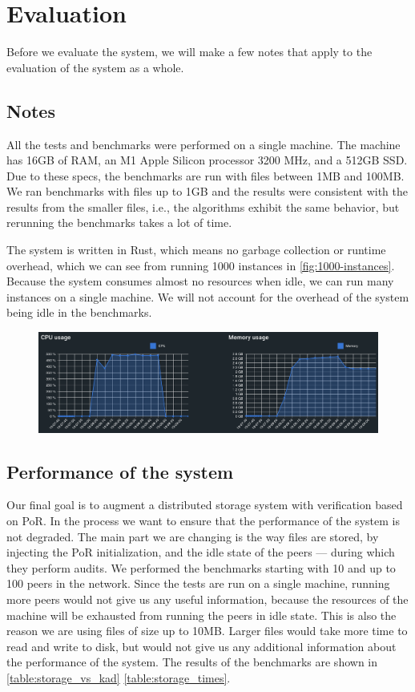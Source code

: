 \chapter{Evaluation}
\label{chapter:evaluation}

Before we evaluate the system, we will make a few notes that apply to the evaluation of the system as a whole.

\section{Notes}

All the tests and benchmarks were performed on a single machine.
The machine has 16GB of RAM, an M1 Apple Silicon processor 3200 MHz, and a 512GB SSD.
Due to these specs, the benchmarks are run with files between 1MB and 100MB.
We ran benchmarks with files up to 1GB and the results were consistent with the results from the smaller files,
i.e., the algorithms exhibit the same behavior, but rerunning the benchmarks takes a lot of time.

The system is written in Rust, which means no garbage collection or runtime overhead,
which we can see from running 1000 instances in \autoref{fig:1000-instances}.
Because the system consumes almost no resources when idle,
we can run many instances on a single machine.
We will not account for the overhead of the system being idle in the benchmarks.

\begin{figure}
    \centering
    \includegraphics[width=350pt]{gfx/1000-instances.png}
    \label{fig:1000-instances}
\end{figure}

\section{Performance of the system}

Our final goal is to augment a distributed storage system with verification based on PoR.
In the process we want to ensure that the performance of the system is not degraded.
The main part we are changing is the way files are stored, by injecting the PoR initialization,
and the idle state of the peers --- during which they perform audits.
We performed the benchmarks starting with 10 and up to 100 peers in the network.
Since the tests are run on a single machine, running more peers would not give us any useful information,
because the resources of the machine will be exhausted from running the peers in idle state.
This is also the reason we are using files of size up to 10MB.
Larger files would take more time to read and write to disk,
but would not give us any additional information about the performance of the system.
The results of the benchmarks are shown in \autoref{table:storage_vs_kad} \autoref{table:storage_times}.

